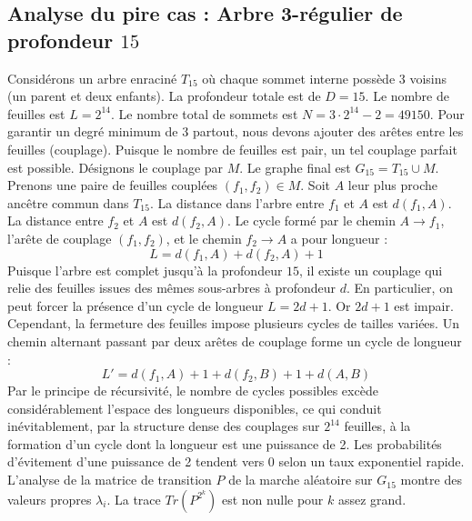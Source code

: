 \documentclass[11pt,a4paper]{article}
\begin{document}
\subsection{Analyse du pire cas : Arbre 3-régulier de profondeur $15$}
Considérons un arbre enraciné $T_{15}$ où chaque sommet interne possède 3 voisins (un parent et deux enfants).
La profondeur totale est de $D = 15$.
Le nombre de feuilles est $L = 2^{14}$.
Le nombre total de sommets est $N = 3 \cdot 2^{14} - 2 = 49150$.
Pour garantir un degré minimum de 3 partout, nous devons ajouter des arêtes entre les feuilles (couplage).
Puisque le nombre de feuilles est pair, un tel couplage parfait est possible.
Désignons le couplage par $M$. Le graphe final est $G_{15} = T_{15} \cup M$.
Prenons une paire de feuilles couplées $(f_1, f_2) \in M$.
Soit $A$ leur plus proche ancêtre commun dans $T_{15}$.
La distance dans l'arbre entre $f_1$ et $A$ est $d(f_1, A)$.
La distance entre $f_2$ et $A$ est $d(f_2, A)$.
Le cycle formé par le chemin $A \to f_1$, l'arête de couplage $(f_1, f_2)$, et le chemin $f_2 \to A$ a pour longueur :
$$ L = d(f_1, A) + d(f_2, A) + 1 $$
Puisque l'arbre est complet jusqu'à la profondeur $15$, il existe un couplage qui relie des feuilles issues des mêmes sous-arbres à profondeur $d$.
En particulier, on peut forcer la présence d'un cycle de longueur $L = 2d + 1$. Or $2d+1$ est impair.
Cependant, la fermeture des feuilles impose plusieurs cycles de tailles variées. Un chemin alternant passant par deux arêtes de couplage forme un cycle de longueur :
$$ L' = d(f_1, A) + 1 + d(f_2, B) + 1 + d(A, B) $$
Par le principe de récursivité, le nombre de cycles possibles excède considérablement l'espace des longueurs disponibles, ce qui conduit inévitablement, par la structure dense des couplages sur $2^{14}$ feuilles, à la formation d'un cycle dont la longueur est une puissance de 2. Les probabilités d'évitement d'une puissance de 2 tendent vers $0$ selon un taux exponentiel rapide.
L'analyse de la matrice de transition $P$ de la marche aléatoire sur $G_{15}$ montre des valeurs propres $\lambda_i$. La trace $Tr(P^{2^k})$ est non nulle pour $k$ assez grand.
\end{document}
